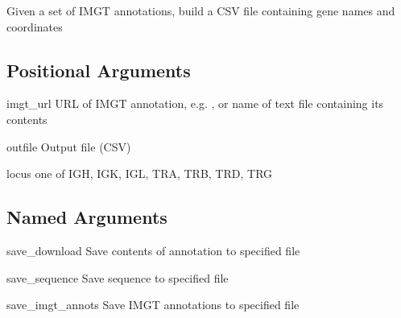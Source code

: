 \documentclass[letterpaper,10pt,english]{sphinxmanual}
\begin{document}
\sphinxAtStartPar

\sphinxAtStartPar
Given a set of IMGT annotations, build a CSV file containing gene names and co\sphinxhyphen{}ordinates


\begin{sphinxVerbatim}[commandchars=\\\{\}]
  \PYG{p}{[}\PYG{p}{]} \PYG{p}{[} \PYG{p}{]} \PYG{p}{[} \PYG{p}{]} \PYG{p}{[} \PYG{p}{]}   
\end{sphinxVerbatim}


\subsection{Positional Arguments}
\label{\detokenize{tools/parse_imgt_annotations:positional-arguments}}\begin{optionlist}{3cm}
\item [imgt\_url]  
\sphinxAtStartPar
URL of IMGT annotation, e.g. , or name of text file containing its contents
\item [outfile]  
\sphinxAtStartPar
Output file (CSV)
\item [locus]  
\sphinxAtStartPar
one of IGH, IGK, IGL, TRA, TRB, TRD, TRG
\end{optionlist}


\subsection{Named Arguments}
\label{\detokenize{tools/parse_imgt_annotations:named-arguments}}\begin{optionlist}{3cm}
\item [\sphinxhyphen{}\sphinxhyphen{}save\_download]  
\sphinxAtStartPar
Save contents of annotation to specified file
\item [\sphinxhyphen{}\sphinxhyphen{}save\_sequence]  
\sphinxAtStartPar
Save sequence to specified file
\item [\sphinxhyphen{}\sphinxhyphen{}save\_imgt\_annots]  
\sphinxAtStartPar
Save IMGT annotations to specified file
\end{optionlist}
\end{document}
